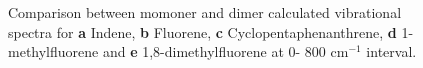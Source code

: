 \begin{figure}[H]
\begin{center}
{\begin{tabular}{c c}
					\end{tabular}}
					\end{center}
					\caption{Comparison between momoner and dimer calculated vibrational spectra for \textbf{a} Indene, \textbf{b} Fluorene, \textbf{c} Cyclopentaphenanthrene, \textbf{d} 1-methylfluorene and \textbf{e} 1,8-dimethylfluorene at 0- 800 cm$^{-1}$ interval.} \label{figP2-18ae}
				\end{figure}
		
		

	
